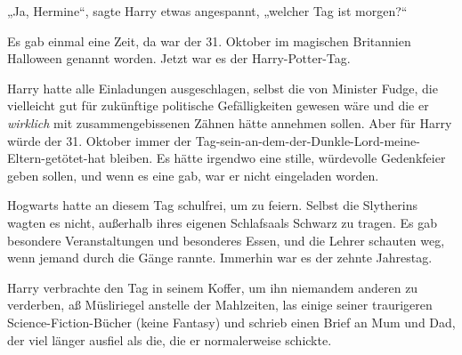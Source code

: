 „Ja, Hermine“, sagte Harry etwas angespannt, „welcher Tag ist morgen?“


Es gab einmal eine Zeit, da war der 31. Oktober im magischen Britannien Halloween genannt worden.
Jetzt war es der Harry-Potter-Tag.

Harry hatte alle Einladungen ausgeschlagen, selbst die von Minister Fudge, die vielleicht gut für zukünftige politische Gefälligkeiten gewesen wäre und die er \emph{wirklich} mit zusammengebissenen Zähnen hätte annehmen sollen. Aber für Harry würde der 31. Oktober immer der Tag-sein-an-dem-der-Dunkle-Lord-meine-Eltern-getötet-hat bleiben. Es hätte irgendwo eine stille, würdevolle Gedenkfeier geben sollen, und wenn es eine gab, war er nicht eingeladen worden.

Hogwarts hatte an diesem Tag schulfrei, um zu feiern. Selbst die Slytherins wagten es nicht, außerhalb ihres eigenen Schlafsaals Schwarz zu tragen. Es gab besondere Veranstaltungen und besonderes Essen, und die Lehrer schauten weg, wenn jemand durch die Gänge rannte. Immerhin war es der zehnte Jahrestag.

Harry verbrachte den Tag in seinem Koffer, um ihn niemandem anderen zu verderben, aß Müsliriegel anstelle der Mahlzeiten, las einige seiner traurigeren Science-Fiction-Bücher (keine Fantasy) und schrieb einen Brief an Mum und Dad, der viel länger ausfiel als die, die er normalerweise schickte.